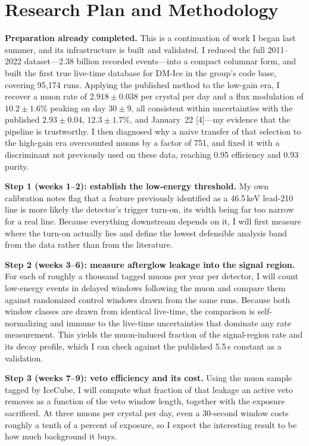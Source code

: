 \documentclass[12pt,letterpaper]{article}
\begin{document}
\section{Research Plan and Methodology}

\noindent\textbf{Preparation already completed.} This is a continuation of work I
began last summer, and its infrastructure is built and validated. I reduced the full
2011--2022 dataset---2.38 billion recorded events---into a compact columnar form, and
built the first true live-time database for DM-Ice in the group's code base, covering
95{,}174 runs. Applying the published method to the low-gain era, I recover a muon rate
of $2.918 \pm 0.038$ per crystal per day and a flux modulation of $10.2 \pm 1.6\%$
peaking on day $30 \pm 9$, all consistent within uncertainties with the published
$2.93 \pm 0.04$, $12.3 \pm 1.7\%$, and January~22 [4]---my evidence that the pipeline
is trustworthy. I then diagnosed why a naive transfer of that selection to the
high-gain era overcounted muons by a factor of 751, and fixed it with a discriminant
not previously used on these data, reaching 0.95 efficiency and 0.93 purity.

\noindent\textbf{Step 1 (weeks 1--2): establish the low-energy threshold.} My own
calibration notes flag that a feature previously identified as a 46.5\,keV lead-210
line is more likely the detector's trigger turn-on, its width being far too narrow for
a real line. Because everything downstream depends on it, I will first measure where
the turn-on actually lies and define the lowest defensible analysis band from the data
rather than from the literature.

\noindent\textbf{Step 2 (weeks 3--6): measure afterglow leakage into the signal
region.} For each of roughly a thousand tagged muons per year per detector, I will
count low-energy events in delayed windows following the muon and compare them against
randomized control windows drawn from the same runs. Because both window classes are
drawn from identical live-time, the comparison is self-normalizing and immune to the
live-time uncertainties that dominate any rate measurement. This yields the
muon-induced fraction of the signal-region rate and its decay profile, which I can
check against the published 5.5\,s constant as a validation.

\noindent\textbf{Step 3 (weeks 7--9): veto efficiency and its cost.} Using the muon
sample tagged by IceCube, I will compute what fraction of that leakage an active veto
removes as a function of the veto window length, together with the exposure sacrificed.
At three muons per crystal per day, even a 30-second window costs roughly a tenth of a
percent of exposure, so I expect the interesting result to be how much background it
buys.
\end{document}
